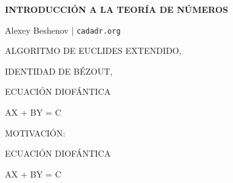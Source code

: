 



\begin{frame}
  \textbf{INTRODUCCIÓN A LA TEORÍA DE NÚMEROS}

  Alexey Beshenov $\mid$ \texttt{cadadr.org}

  \vfill

  \begin{center}\huge\headingfont
    ALGORITMO DE EUCLIDES EXTENDIDO,

    \vspace{0.5em}

    IDENTIDAD DE BÉZOUT,

    \vspace{0.5em}

    ECUACIÓN DIOFÁNTICA

    AX + BY = C
  \end{center}

  \vfill
\end{frame}

\begin{frame}

  \vfill

  \begin{center}\huge\headingfont
    MOTIVACIÓN:

    \vspace{0.5em}

    ECUACIÓN DIOFÁNTICA

    AX + BY = C
  \end{center}

  \vfill
\end{frame}

